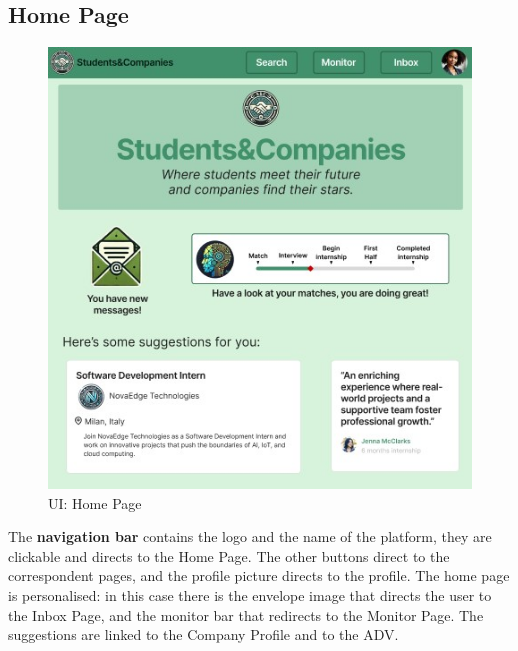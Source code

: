 \subsection{Home Page}
\begin{figure}[H]
    \centering
    \includegraphics[width=15cm]{images/ui/homepage.jpg}
    \caption{UI: Home Page}
\end{figure}
The \textbf{navigation bar} contains the logo and the name of the platform, they are clickable and directs to the Home Page. The other buttons direct to the correspondent pages, and the profile picture directs to the profile.
The home page is personalised: in this case there is the envelope image that directs the user to the Inbox Page, and the monitor bar that redirects to the Monitor Page. The suggestions are linked to the Company Profile and to the ADV.

